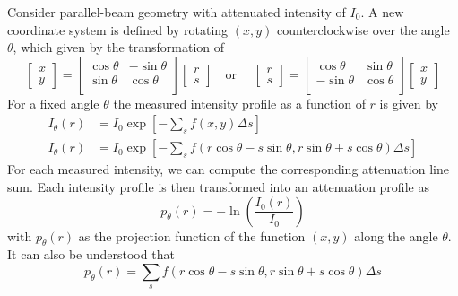 \documentclass[../../../main.tex]{subfiles}
\begin{document}
Consider parallel-beam geometry with attenuated intensity of $I_0$.
A new coordinate system is defined by rotating $(x,y)$ counterclockwise over the angle $\theta$, which given by the transformation of
\begin{equation*}
    \begin{bmatrix}
        x \\y
    \end{bmatrix}
    =
    \begin{bmatrix}
        \cos \theta & -\sin \theta \\
        \sin \theta & \cos \theta  \\
    \end{bmatrix}
    \begin{bmatrix}
        r \\s
    \end{bmatrix}
    \quad \text{or }\quad
    \begin{bmatrix}
        r \\s
    \end{bmatrix}
    =
    \begin{bmatrix}
        \cos \theta  & \sin \theta \\
        -\sin \theta & \cos \theta \\
    \end{bmatrix}
    \begin{bmatrix}
        x \\y
    \end{bmatrix}
\end{equation*}
For a fixed angle $\theta$ the measured intensity profile as a function of $r$ is given by
\begin{align*}
    I_\theta(r) & = I_0 \exp \left[ -\sum_s f(x,y)\Delta s \right]                                                                    \\
    I_\theta(r) & = I_0 \exp \left[ -\sum_s f \left( r \cos \theta-s \sin \theta,r \sin \theta+s \cos \theta \right) \Delta s \right]
\end{align*}
For each measured intensity, we can compute the corresponding attenuation line sum.
Each intensity profile is then transformed into an attenuation profile as
\begin{equation*}
    p_\theta(r)=-\ln \left(  \frac{I_0(r )}{I_0}\right)
\end{equation*}
with $p_\theta(r)$ as the projection function of the function $(x,y)$ along the angle $\theta$.
It can also be understood that
\begin{equation*}
    p_\theta(r)=\sum_s f \left( r \cos \theta-s \sin \theta,r \sin \theta+s \cos \theta \right) \Delta s
\end{equation*}
\end{document}

